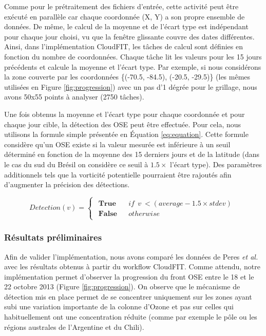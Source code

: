 Comme pour le prétraitement des fichiers d'entrée, cette activité peut être exécuté en parallèle car chaque coordonnée (X, Y) a son propre ensemble de données. De même, le calcul de la moyenne et de l'écart type est indépendant pour chaque jour choisi, vu que la fenêtre glissante couvre des dates différentes. Ainsi, dans l'implémentation CloudFIT, les tâches de calcul sont définies en fonction du nombre de coordonnées. Chaque tâche lit les valeurs pour les 15 jours précédents et calcule la moyenne et l'écart type. Par exemple, si nous considérons la zone couverte par les coordonnées \{(-70.5, -84.5), (-20.5, -29.5)\} (les mêmes utilisées en Figure \ref{fig:progression}) avec un pas d'1 dégrée pour le grillage, nous avons 50x55 points à analyser (2750 tâches). 

Une fois obtenus la moyenne et l'écart type pour chaque coordonnée et pour chaque jour cible, la détection des OSE peut être effectuée.  Pour cela, nous utilisons la formule simple présentée en Équation \ref{eq:equation}. Cette formule considère qu'un OSE existe si la valeur mesurée est inférieure à un seuil déterminé en fonction de la moyenne des 15 derniers jours et de la latitude (dans le cas du sud du Brésil on considère ce seuil à $1.5 \times$ l'écart type). Des paramètres additionnels tels que la vorticité potentielle pourraient être rajoutés afin d'augmenter la précision des détections.

\begin{equation}
Detection(v)=\left\{ \begin{array}{c}
\begin{array}{lll}
\textbf{True} & &if \:\: v \:< (average - 1.5\times stdev)\\
\textbf{False} & &otherwise\end{array}\end{array}\right.
\label{eq:equation}
\end{equation}



\subsubsection*{Résultats préliminaires}

Afin de valider l'implémentation, nous avons comparé les données de Peres \textit{et al.} \cite{Peres2013} avec les résultats obtenus à partir du workflow CloudFIT. Comme attendu, notre implémentation permet d'observer la progression du front OSE entre le 18 et le 22 octobre 2013 (Figure \ref{fig:progression}). On observe que le mécanisme de détection mis en place permet de se concentrer uniquement sur les zones ayant subi une variation importante de la colonne d'Ozone et pas sur celles qui habituellement ont une concentration réduite (comme par exemple le pôle ou les régions australes de l'Argentine et du Chili). 

